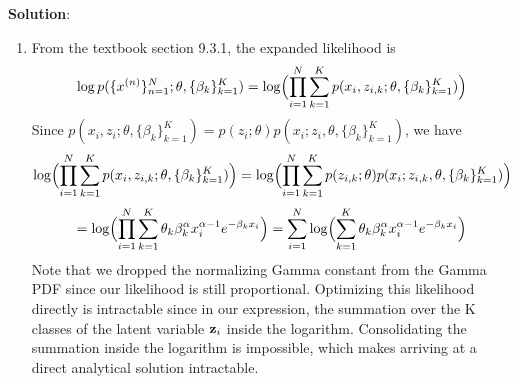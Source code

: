 \documentclass[submit]{../harvardml}
\newenvironment{solution}{
    \vspace{2mm}
    \color{blue}\noindent\textbf{Solution}:
}{}
\begin{document}
\begin{solution}
\begin{enumerate}
    \item From the textbook section 9.3.1, the expanded likelihood is 
    $$\log p(\{x^{(n)}\}^N_{n = 1}; \mathbf{\theta}, \{\beta_k\}^K_{k = 1}) = \log \Bigl( \prod_{i=1}^N \sum_{k=1}^K p(x_i, z_{i,k}; \theta, \{\beta_k\}^K_{k = 1}) \Bigr)$$
    Since $p(x_i, z_i; \theta, \{\beta_k\}^K_{k = 1}) = p(z_i ; \theta) p(x_i ; z_i, \theta, \{\beta_k\}^K_{k = 1})$, we have
    $$\log \Bigl( \prod_{i=1}^N \sum_{k=1}^K p(x_i, z_{i,k}; \theta, \{\beta_k\}^K_{k = 1}) \Bigr) = \log \Bigl( \prod_{i=1}^N \sum_{k=1}^K p(z_{i,k} ; \theta) p(x_i ; z_{i,k}, \theta, \{\beta_k\}^K_{k = 1}) \Bigr)$$
    $$ = \log \Bigl( \prod_{i=1}^N \sum_{k=1}^K \theta_k \beta_k^{\alpha}x_i^{\alpha - 1} e^{-\beta_k x_i} \Bigr) = \sum_{i=1}^N \log \Bigl(\sum_{k=1}^K \theta_k \beta_k^{\alpha}x_i^{\alpha - 1} e^{-\beta_k x_i} \Bigr)$$
    Note that we dropped the normalizing Gamma constant from the Gamma PDF since our likelihood is still proportional. Optimizing this likelihood directly is intractable since in our expression, the summation over the K classes of the latent variable $\bold z_i$ inside the logarithm. Consolidating the summation inside the logarithm is impossible, which makes arriving at a direct analytical solution intractable.


\end{enumerate}
\end{solution}
\end{document}
